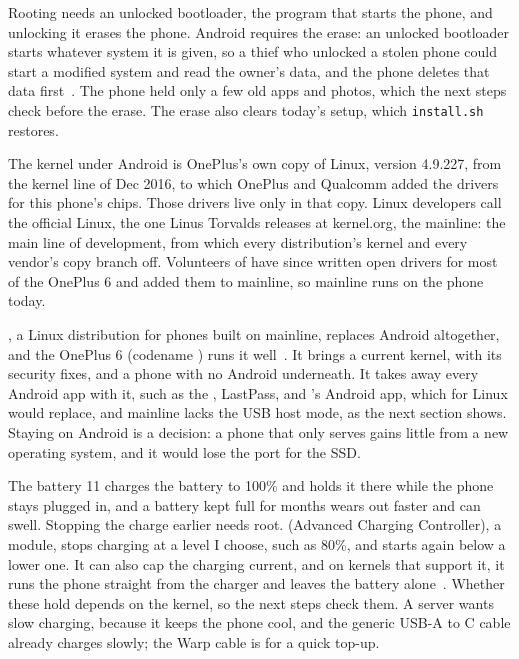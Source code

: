 \documentclass[11pt,a4paper]{article}
\begin{document}
 Rooting needs an unlocked bootloader, the program that starts the phone, and unlocking it erases the phone. Android requires the erase: an unlocked bootloader starts whatever system it is given, so a thief who unlocked a stolen phone could start a modified system and read the owner's data, and the phone deletes that data first~\cite{aosp}. The phone held only a few old apps and photos, which the next steps check before the erase. The erase also clears today's setup, which \texttt{install.sh} restores.

 The kernel under Android is OnePlus's own copy of Linux, version 4.9.227, from the kernel line of Dec 2016, to which OnePlus and Qualcomm added the drivers for this phone's chips. Those drivers live only in that copy. Linux developers call the official Linux, the one Linus Torvalds releases at kernel.org, the mainline: the main line of development, from which every distribution's kernel and every vendor's copy branch off. Volunteers of  have since written open drivers for most of the OnePlus 6 and added them to mainline, so mainline runs on the phone today.

 , a Linux distribution for phones built on mainline, replaces Android altogether, and the OnePlus 6 (codename ) runs it well~\cite{pmos}. It brings a current kernel, with its security fixes, and a phone with no Android underneath. It takes away every Android app with it, such as the , LastPass, and 's Android app, which  for Linux would replace, and mainline lacks the USB host mode, as the next section shows. Staying on Android is a decision: a phone that only serves gains little from a new operating system, and it would lose the port for the SSD.

\begin{insight}{The battery}
 11 charges the battery to 100\% and holds it there while the phone stays plugged in, and a battery kept full for months wears out faster and can swell. Stopping the charge earlier needs root.  (Advanced Charging Controller), a  module, stops charging at a level I choose, such as 80\%, and starts again below a lower one. It can also cap the charging current, and on kernels that support it, it runs the phone straight from the charger and leaves the battery alone~\cite{acc}. Whether these hold depends on the kernel, so the next steps check them. A server wants slow charging, because it keeps the phone cool, and the generic USB-A to C cable already charges slowly; the Warp cable is for a quick top-up.
\end{insight}
\end{document}
